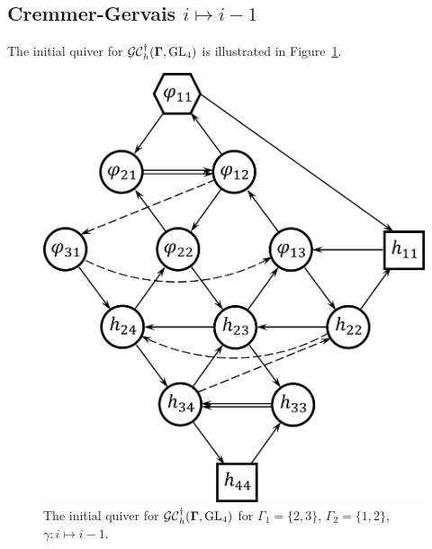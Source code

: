  \subsection{Cremmer-Gervais $i \mapsto i-1$}
The initial quiver for $\mathcal{GC}_h^{\dagger}(\mathbf{\Gamma},\operatorname{GL}_4)$ is illustrated in Figure~\ref{f:n=4_CG_i-i-1}.

\begin{figure}[htb]
\begin{center}
\includegraphics[scale=0.65]{h_convention/h_n=4_CG_i-i-1.png}
\end{center}
\caption{The initial quiver for $\mathcal{GC}^{\dagger}_h(\mathbf{\Gamma},\operatorname{GL}_4)$ for $\Gamma_1 = \{2,3\}$, $\Gamma_2 = \{1,2\}$, $\gamma:i \mapsto i-1$.}
\label{f:n=4_CG_i-i-1}
\end{figure}
 
